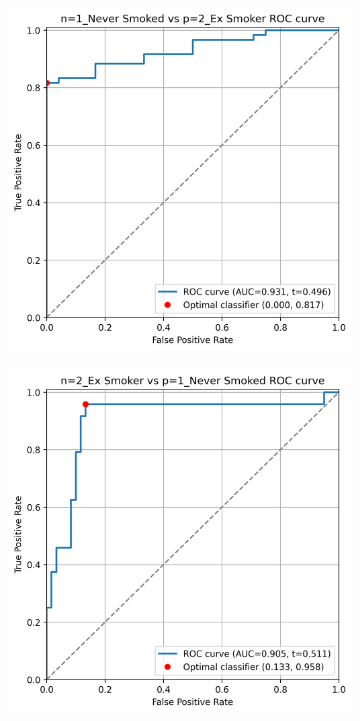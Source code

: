 \documentclass{article} %
\begin{document}
\begin{figure}[p]
    \begin{subfigure}{0.46\linewidth}
        \centering
        \includegraphics[width=\linewidth]{cohort1/test_1v2_roc.png}
    \end{subfigure}
    \hspace{4mm}
    \begin{subfigure}{0.46\linewidth}
        \centering
        \includegraphics[width=\linewidth]{cohort1/test_2v1_roc.png}

\end{subfigure}
\end{figure}
\end{document}
